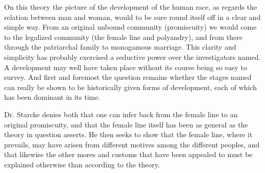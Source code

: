 \documentclass[12pt,a4paper,openany]{book}
\newcommand{\opage}[1]{\marginnote{\footnotesize\textit{[#1]}}}
\begin{document}
On this theory the picture of the development of the human race,
as regards the relation between man and woman, would to be
sure round itself off in a clear and simple way. From an original
unbound community (promiscuity) we would come to the legalized
community (the female line and polyandry), and from there through
the patriarchal family to monogamous marriage. This
clarity and simplicity has probably exercised a seductive power over
the investigators named. A development may well have taken place
without its course being so easy to survey. And first and foremost
the question remains whether the stages named can really be shown
to be historically given forms of development, each of which has
been dominant in its time.

\opage{790}Dr. Starcke denies both that one can infer back from the female line
to an original promiscuity, and that the female line
itself has been as general as the theory in question asserts.
He then seeks to show that the female line, where it prevails,
may have arisen from different motives among the different peoples,
and that likewise the other mores and customs that have been appealed to
must be explained otherwise than according to the theory.
\end{document}

